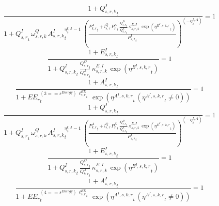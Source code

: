 \noindent[name= `regional sector demand for intermediates from aggregate sector 3 1 3']
\begin{dmath}
\frac{1+{{Q^{I}_{s,r,k}}}_{t}}{1+{{Q^{I}_{s,r}}}_{t}\, {{\omega^{Q}_{s,r,k}}}\, {{A^{I}_{s,r,k}}}_{t}^{{{\eta^{I,A}_{s}}}-1}\, \left(\frac{{{P^{A}_{k,r}}}_{t}+{{l^{Q}_{s,r}}}\, {{P^E_r}}_{t}\, \frac{{{Q^{D}_{s,r}}}_{t}}{{{Q^{A}_{k,r}}}_{t}}\, {{\kappa^{E,I}_{s,r,k}}}\, \exp\left({{\eta^{E^{I},s,k,r}}}_{t}\right)}{{{P^{I}_{s,r}}}_{t}}\right)^{\left(-{{\eta^{I,A}_{s}}}\right)}}=1
\end{dmath}
\noindent[name= `regional emissions caused by using intermediates from aggregate sector 3 1 3']
\begin{dmath}
\frac{1+{{E^I_{s,r,k}}}_{t}}{1+{{Q^{I}_{s,r,k}}}_{t}\, \frac{{{Q^{D}_{s,r}}}_{t}}{{{Q^{A}_{k,r}}}_{t}}\, {{\kappa^{E,I}_{s,r,k}}}\, \exp\left({{\eta^{E^{I},s,k,r}}}_{t}\right)}=1
\end{dmath}
\noindent[name= `productivity of intermediates in subsector 3 region 1 from sector 3']
\begin{dmath}
\frac{1+{{A^{I}_{s,r,k}}}_{t}}{1+{{EE_r}}_{t}^{\left(3=={{s^{Energy}}}\right)\, {{\ell^{EE}_{s,r}}}_{t}}\, \exp\left({{\eta^{A^{I},s,k,r}}}_{t}\, \left({{\eta^{A^{I},s,k,r}}}_{t}\neq 0\right)\right)}=1
\end{dmath}
\noindent[name= `regional sector demand for intermediates from aggregate sector 3 1 4']
\begin{dmath}
\frac{1+{{Q^{I}_{s,r,k}}}_{t}}{1+{{Q^{I}_{s,r}}}_{t}\, {{\omega^{Q}_{s,r,k}}}\, {{A^{I}_{s,r,k}}}_{t}^{{{\eta^{I,A}_{s}}}-1}\, \left(\frac{{{P^{A}_{k,r}}}_{t}+{{l^{Q}_{s,r}}}\, {{P^E_r}}_{t}\, \frac{{{Q^{D}_{s,r}}}_{t}}{{{Q^{A}_{k,r}}}_{t}}\, {{\kappa^{E,I}_{s,r,k}}}\, \exp\left({{\eta^{E^{I},s,k,r}}}_{t}\right)}{{{P^{I}_{s,r}}}_{t}}\right)^{\left(-{{\eta^{I,A}_{s}}}\right)}}=1
\end{dmath}
\noindent[name= `regional emissions caused by using intermediates from aggregate sector 3 1 4']
\begin{dmath}
\frac{1+{{E^I_{s,r,k}}}_{t}}{1+{{Q^{I}_{s,r,k}}}_{t}\, \frac{{{Q^{D}_{s,r}}}_{t}}{{{Q^{A}_{k,r}}}_{t}}\, {{\kappa^{E,I}_{s,r,k}}}\, \exp\left({{\eta^{E^{I},s,k,r}}}_{t}\right)}=1
\end{dmath}
\noindent[name= `productivity of intermediates in subsector 3 region 1 from sector 4']
\begin{dmath}
\frac{1+{{A^{I}_{s,r,k}}}_{t}}{1+{{EE_r}}_{t}^{\left(4=={{s^{Energy}}}\right)\, {{\ell^{EE}_{s,r}}}_{t}}\, \exp\left({{\eta^{A^{I},s,k,r}}}_{t}\, \left({{\eta^{A^{I},s,k,r}}}_{t}\neq 0\right)\right)}=1
\end{dmath}

